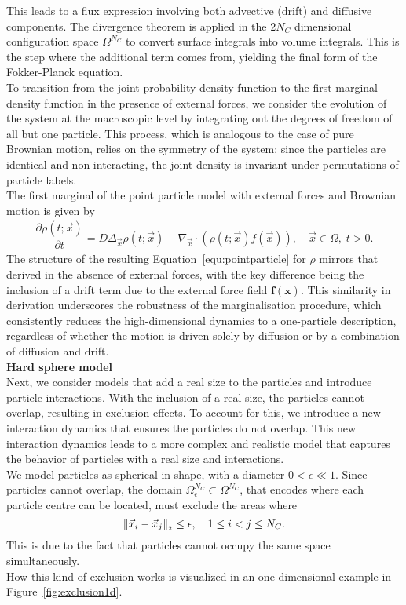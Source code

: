 This leads to a flux expression involving both advective (drift) and diffusive components. 
The divergence theorem is applied in the $2 N_C$ dimensional configuration space $\Omega^{N_C}$ to convert surface integrals into volume integrals.
This is the step where the additional term comes from, yielding the final form of the Fokker-Planck equation. \\
To transition from the joint probability density function to the first marginal density function in the presence of external forces, we consider the evolution of the system at the macroscopic level by integrating out the degrees of freedom of all but one particle. 
This process, which is analogous to the case of pure Brownian motion, relies on the symmetry of the system: since the particles are identical and non-interacting, the joint density is invariant under permutations of particle labels. \\
The first marginal of the point particle model with external forces and Brownian motion is given by 
\begin{align}
	\dfrac{\partial \rho (t; \vec{x})}{\partial t} = D \Delta_{\vec{x}} \rho(t; \vec{x}) - \nabla_{\vec{x}} \cdot (\rho(t; \vec{x}) f(\vec{x}) ), \quad \vec{x} \in \Omega, \; t>0.
	\label{equ:pointparticle}
\end{align}
The structure of the resulting Equation~\eqref{equ:pointparticle} for $\rho$ mirrors that derived in the absence of external forces, with the key difference being the inclusion of a drift term due to the external force field $\mathbf{f}(\mathbf{x})$. 
This similarity in derivation underscores the robustness of the marginalisation procedure, which consistently reduces the high-dimensional dynamics to a one-particle description, regardless of whether the motion is driven solely by diffusion or by a combination of diffusion and drift. \\


\textbf{Hard sphere model} \\
Next, we consider models that add a real size to the particles and introduce particle interactions. 
With the inclusion of a real size, the particles cannot overlap, resulting in exclusion effects. 
To account for this, we introduce a new interaction dynamics that ensures the particles do not overlap. 
This new interaction dynamics leads to a more complex and realistic model that captures the behavior of particles with a real size and interactions. \\
We model particles as spherical in shape, with a diameter $0 < \epsilon \ll 1$. 
Since particles cannot overlap, the domain $\Omega_{\epsilon}^{N_C} \subset \Omega^{N_C}$, that encodes where each particle centre can be located, must exclude the areas where \[ \norm[\vec{x}_i - \vec{x}_j] \leq \epsilon, \quad 1 \leq i < j \leq N_C.\] 
This is due to the fact that particles cannot occupy the same space simultaneously. \\
How this kind of exclusion works is visualized in an one dimensional example in Figure~\ref{fig:exclusion1d}.  

